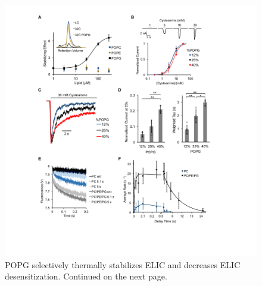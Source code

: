 \begin{figure}
\includegraphics[width=\linewidth]{./pandoc_test/media/image4.pdf} 
\caption[POPG selectively thermally stabilizes ELIC and decreases ELIC desensitization.]{POPG selectively thermally stabilizes ELIC and decreases ELIC desensitization. Continued on the next page.}
\label{fig:four}
\end{figure}

